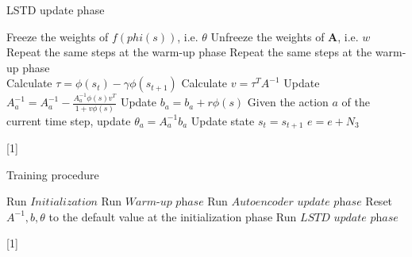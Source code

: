 \documentclass[a4paper,12pt,oneside]{article}
\numberwithin{equation}{section}
\begin{document}
    \clearpage
    \begin{algorithm}
    \caption{LSTD update phase}
        \begin{algorithmic}[1]
            \State Freeze the weights of \(f(phi(s))\), i.e. $\theta$
            \State Unfreeze the weights of $\mathbf{A}$, i.e. \(w\)
            \State Repeat the same steps at the warm-up phase
                \State Repeat the same steps at the warm-up phase
                \\
                \State Calculate $\tau = \phi(s_t) - \gamma \phi(s_{t+1})$
                \State Calculate $v = \tau^{T} A^{-1}$
                \State Update $A_a^{-1} = A_a^{-1} - \frac{A_a^{-1} \phi(s) v^{T}}{1 + v \phi(s)}$
                \State Update $b_a = b_a + r \phi(s)$
                \State Given the action $a$ of the current time step, update $\theta_a = A_a^{-1} b_a $
                \State Update state $s_t=s_{t+1}$
            \EndFor
        \EndFor
        \State $e=e+N_3$
        \end{algorithmic}[1]    
    \end{algorithm}


    \clearpage
    \begin{algorithm}
        \caption{Training procedure}
        \begin{algorithmic}[1]
        \State Run \(Initialization\)
            \State Run \(\textit{Warm-up phase}\)
            \State Run \(\textit{Autoencoder update phase}\)
            \State Reset $A^{-1}, b, \theta$ to the default value at the initialization phase
            \State Run \(\textit{LSTD update phase}\)
            \EndFor
        \EndFor
        \end{algorithmic}[1]    
    \end{algorithm}
    
    
\end{document}
